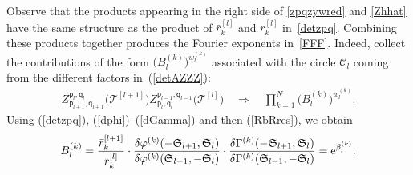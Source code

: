 \documentclass[pdftex]{sigma}
\numberwithin{equation}{section}
\begin{document}
Observe that the products appearing in the right side of \eqref{zpqzywred} and \eqref{Zhhat} have the same structure as the product of $\bar r_k^{[l]}$ and $r_k^{[l]}$ in~\eqref{detzpq}. Combining these products together produces the Fourier exponents in~\eqref{FFF}. Indeed, collect the contributions of the form $\big(B_l^{(k)}\big)^{w_l^{(k)}}$ associated with the circle $\mathcal{C}_l$ coming from the different factors in~(\ref{detAZZZ}):
\begin{gather*} %
Z^{\boldsymbol{\mathsf p}_{l},\boldsymbol{\mathsf q}_{l}}_{\boldsymbol{\mathsf p}_{l+1},\boldsymbol{\mathsf q}_{l+1}}\big(\mathcal T^{[l+1]}\big)
Z^{\boldsymbol{\mathsf p}_{l-1},\boldsymbol{\mathsf q}_{l-1}}_{\boldsymbol{\mathsf p}_{l},\boldsymbol{\mathsf q}_{l}}\big(\mathcal T^{[l]}\big) \quad \Longrightarrow \quad \prod_{k=1}^N \big(B_l^{(k)}\big)^{w_l^{(k)}}.
\end{gather*}
Using (\ref{detzpq}), (\ref{dphi})--(\ref{dGamma}) and then (\ref{RbRres}), we obtain
\begin{gather*}
B_l^{(k)}=\frac{\bar r_k^{[l+1]}}{r_k^{[l]}}\cdot
\frac{\delta \varphi^{(k)}(-\mathfrak S_{l+1}, \mathfrak S_{l})}
{\delta \varphi^{(k)}(\mathfrak S_{l-1}, - \mathfrak S_{l})}\cdot
\frac{\delta \Gamma^{(k)}(-\mathfrak S_{l+1}, \mathfrak S_{l})}
{\delta \Gamma^{(k)}(\mathfrak S_{l-1}, - \mathfrak S_{l})}={\rm e}^{\beta_l^{(k)}}.
\end{gather*}
\end{document}
